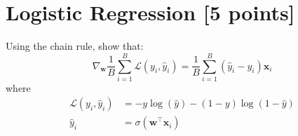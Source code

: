 %

\renewcommand\thesection{\arabic{section}}
\renewcommand\thesubsection{\thesection.\arabic{subsection}}

\section{Logistic Regression [5 points]}
Using the chain rule, show that:
\begin{equation}
    \nabla_{\mathbf{w}} \frac{1}{B} \sum_{i=1}^{B} \mathcal{L} \left(y_i, \hat{y}_i \right) = \frac{1}{B} \sum_{i=1}^{B} \left(\hat{y}_i - y_i \right) \mathbf{x}_i
\end{equation}
where
\begin{equation}
    \begin{aligned}
        \mathcal{L} \left(y_i, \hat{y}_i \right) &= -y \log \left(\hat{y}\right) - \left(1 - y\right) \log \left(1 - \hat{y} \right) \\
        \hat{y}_i &= \sigma\left(\mathbf{w}^\intercal \mathbf{x}_i \right)
    \end{aligned}
\end{equation}

